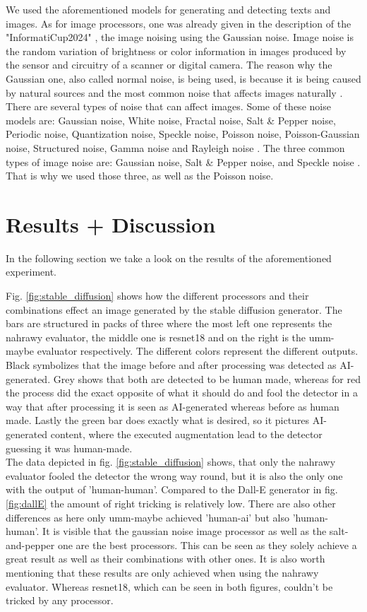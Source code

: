 \documentclass{article} %
\begin{document}
We used the aforementioned models for generating and detecting texts and images. As for image processors, one was already given in the description of the "InformatiCup2024" \cite{InformatiCup}, the image noising using the Gaussian noise. Image noise is the random variation of brightness or color information in images produced by the sensor and circuitry of a scanner or digital camera. The reason why the Gaussian one, also called normal noise, is being used, is because it is being caused by natural sources and the most common noise that affects images naturally \cite{mohammed2016study}. \\
There are several types of noise that can affect images. Some of these noise models are: Gaussian noise, White noise, Fractal noise, Salt \& Pepper noise, Periodic noise, Quantization noise, Speckle noise, Poisson noise, Poisson-Gaussian noise, Structured noise, Gamma noise and Rayleigh noise \cite{gonzalez2009digital}. The three common types of image noise are: Gaussian noise, Salt \& Pepper noise, and Speckle noise \cite{al2010comparative}. That is why we used those three, as well as the Poisson noise.

\section{Results + Discussion}
In the following section we take a look on the results of the aforementioned experiment.


Fig. \ref{fig:stable_diffusion} shows how the different processors and their combinations effect an image generated by the stable diffusion generator. The bars are structured in packs of three where the most left one represents the nahrawy evaluator, the middle one is resnet18 and on the right is the umm-maybe evaluator respectively. The different colors represent the different outputs. Black symbolizes that the image before and after processing was detected as AI-generated. Grey shows that both are detected to be human made, whereas for red the process did the exact opposite of what it should do and fool the detector in a way that after processing it is seen as AI-generated whereas before as human made. Lastly the green bar does exactly what is desired, so it pictures AI-generated content, where the executed augmentation lead to the detector guessing it was human-made. \\
The data depicted in fig. \ref{fig:stable_diffusion} shows, that only the nahrawy evaluator fooled the detector the wrong way round, but it is also the only one with the output of 'human-human'. Compared to the Dall-E generator in fig. \ref{fig:dallE} the amount of right tricking is relatively low. There are also other differences as here only umm-maybe achieved 'human-ai' but also 'human-human'.
It is visible that the gaussian noise image processor as well as the salt-and-pepper one are the best processors. This can be seen as they solely achieve a great result as well as their combinations with other ones. It is also worth mentioning that these results are only achieved when using the nahrawy evaluator. Whereas resnet18, which can be seen in both figures, couldn't be tricked by any processor.
\end{document}
